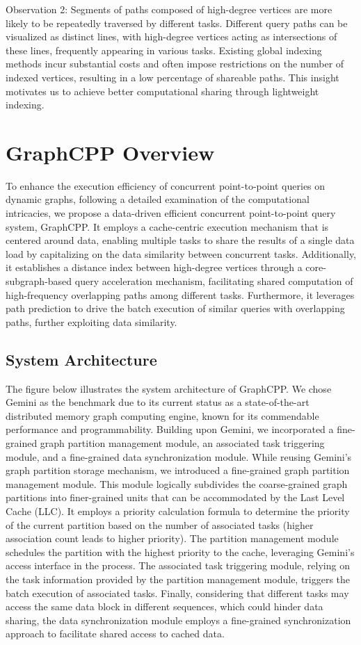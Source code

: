 \documentclass[lettersize,journal]{IEEEtran} %
\begin{document}
Observation 2: Segments of paths composed of high-degree vertices are more likely to be repeatedly traversed by different tasks. Different query paths can be visualized as distinct lines, with high-degree vertices acting as intersections of these lines, frequently appearing in various tasks. Existing global indexing methods incur substantial costs and often impose restrictions on the number of indexed vertices, resulting in a low percentage of shareable paths. This insight motivates us to achieve better computational sharing through lightweight indexing.


\section{GraphCPP Overview}
To enhance the execution efficiency of concurrent point-to-point queries on dynamic graphs, following a detailed examination of the computational intricacies, we propose a data-driven efficient concurrent point-to-point query system, GraphCPP. It employs a cache-centric execution mechanism that is centered around data, enabling multiple tasks to share the results of a single data load by capitalizing on the data similarity between concurrent tasks. Additionally, it establishes a distance index between high-degree vertices through a core-subgraph-based query acceleration mechanism, facilitating shared computation of high-frequency overlapping paths among different tasks. Furthermore, it leverages path prediction to drive the batch execution of similar queries with overlapping paths, further exploiting data similarity.

\subsection{System Architecture}
The figure below illustrates the system architecture of GraphCPP. We chose Gemini as the benchmark due to its current status as a state-of-the-art distributed memory graph computing engine, known for its commendable performance and programmability.
Building upon Gemini, we incorporated a fine-grained graph partition management module, an associated task triggering module, and a fine-grained data synchronization module. While reusing Gemini's graph partition storage mechanism, we introduced a fine-grained graph partition management module. This module logically subdivides the coarse-grained graph partitions into finer-grained units that can be accommodated by the Last Level Cache (LLC). It employs a priority calculation formula to determine the priority of the current partition based on the number of associated tasks (higher association count leads to higher priority). The partition management module schedules the partition with the highest priority to the cache, leveraging Gemini's access interface in the process. The associated task triggering module, relying on the task information provided by the partition management module, triggers the batch execution of associated tasks. Finally, considering that different tasks may access the same data block in different sequences, which could hinder data sharing, the data synchronization module employs a fine-grained synchronization approach to facilitate shared access to cached data.
\end{document}
